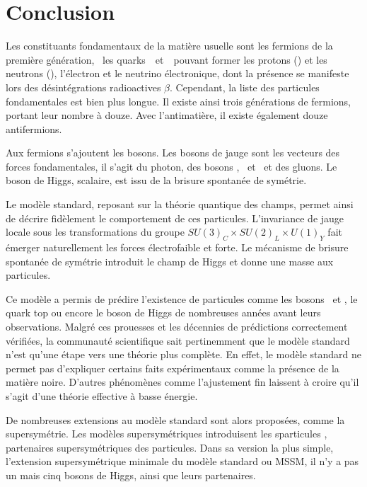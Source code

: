 \section{Conclusion}\label{chapter-MS-MSSM-section-conclusion}
Les constituants fondamentaux de la matière usuelle sont les fermions de la première génération, \ie\ les quarks~\quarku\ et~\quarkd\ pouvant former les protons (\quarku\quarku\quarkd) et les neutrons (\quarku\quarkd\quarkd), l'électron et le neutrino électronique, dont la présence se manifeste lors des désintégrations radioactives $\beta$.
Cependant, la liste des particules fondamentales est bien plus longue.
Il existe ainsi trois générations de fermions, portant leur nombre à douze.
Avec l'antimatière, il existe également douze antifermions.
\par Aux fermions s'ajoutent les bosons.
Les bosons de jauge sont les vecteurs des forces fondamentales, il s'agit du photon, des bosons \Wbosonplus, \Wbosonminus\ et \Zboson\ et des gluons.
Le boson de Higgs, scalaire, est issu de la brisure spontanée de symétrie.
\par Le modèle standard, reposant sur la théorie quantique des champs, permet ainsi de décrire fidèlement le comportement de ces particules.
L'invariance de jauge locale sous les transformations du groupe $SU(3)_C \times SU(2)_L \times U(1)_Y$ fait émerger naturellement les forces électrofaible et forte.
Le mécanisme de brisure spontanée de symétrie introduit le champ de Higgs et donne une masse aux particules.
\par Ce modèle a permis de prédire l'existence de particules comme les bosons \Wboson\ et \Zboson, le quark top ou encore le boson de Higgs de nombreuses années avant leurs observations.
Malgré ces prouesses et les décennies de prédictions correctement vérifiées, la communauté scientifique sait pertinemment que le modèle standard n'est qu'une étape vers une théorie plus complète.
En effet, le modèle standard ne permet pas d'expliquer certains faits expérimentaux comme la présence de la matière noire.
D'autres phénomènes comme l'ajustement fin laissent à croire qu'il s'agit d'une théorie effective à basse énergie.
\par De nombreuses extensions au modèle standard sont alors proposées, comme la supersymétrie.
Les modèles supersymétriques introduisent les \og sparticules \fg, partenaires supersymétriques des particules.
Dans sa version la plus simple, l'extension supersymétrique minimale du modèle standard ou MSSM, il n'y a pas un mais cinq bosons de Higgs, ainsi que leurs partenaires.
